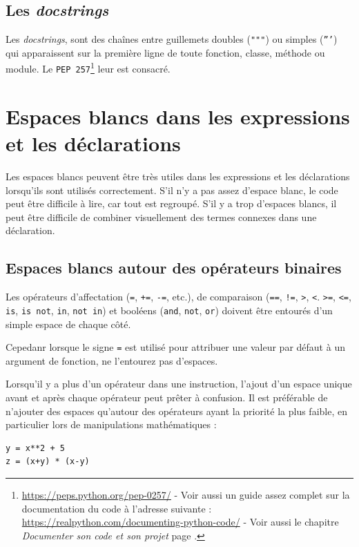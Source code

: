 \documentclass[a4paper,12pt]{book}
\begin{document}
\subsection*{Les \textit{docstrings}}
Les \textit{docstrings}, sont des chaînes entre guillemets doubles (\texttt{"""}) ou simples (\texttt{'''}) qui apparaissent sur la première ligne de toute fonction, classe, méthode ou module. Le \texttt{PEP 257}\footnote{\url{https://peps.python.org/pep-0257/} - Voir aussi un guide assez complet sur la documentation du code à l'adresse suivante : \url{https://realpython.com/documenting-python-code/} - Voir aussi le chapitre \textit{Documenter son code et son projet} page \pageref{documentercodeprojet}.} leur est consacré.
\medskip

\section{Espaces blancs dans les expressions et les déclarations}
Les espaces blancs peuvent être très utiles dans les expressions et les déclarations lorsqu'ils sont utilisés correctement. S'il n'y a pas assez d'espace blanc, le code peut être difficile à lire, car tout est regroupé. S'il y a trop d'espaces blancs, il peut être difficile de combiner visuellement des termes connexes dans une déclaration.
\medskip

\subsection*{Espaces blancs autour des opérateurs binaires
}
Les opérateurs d'affectation (\texttt{=}, \texttt{+=}, \texttt{-=}, etc.), de comparaison (\texttt{==}, \texttt{!=}, \texttt{>}, \texttt{<}. \texttt{>=}, \texttt{<=}, \texttt{is}, \texttt{is not}, \texttt{in}, \texttt{not in}) et booléens (\texttt{and}, \texttt{not}, \texttt{or}) doivent être entourés d'un simple espace de chaque côté.
\medskip

Cepedanr lorsque le signe \texttt{=} est utilisé pour attribuer une valeur par défaut à un argument de fonction, ne l'entourez pas d'espaces.
\medskip

Lorsqu'il y a plus d'un opérateur dans une instruction, l'ajout d'un espace unique avant et après chaque opérateur peut prêter à confusion. Il est préférable de n'ajouter des espaces qu'autour des opérateurs ayant la priorité la plus faible, en particulier lors de manipulations mathématiques : 
\begin{lstlisting}
y = x**2 + 5
z = (x+y) * (x-y)
\end{lstlisting}
\medskip
\end{document}
